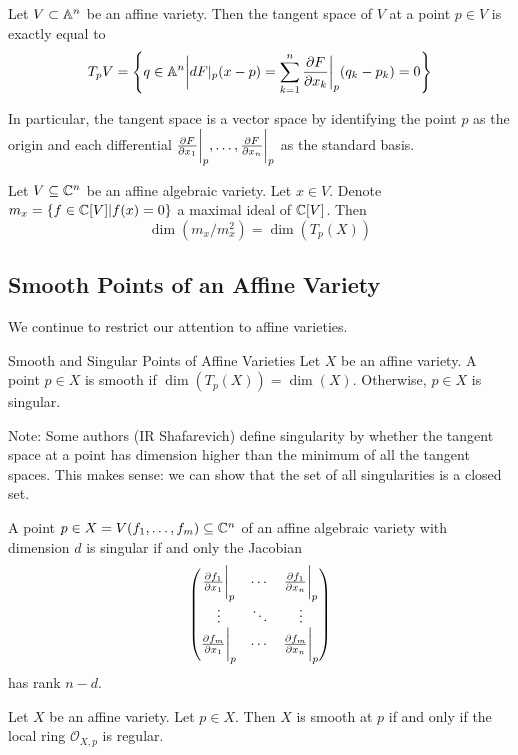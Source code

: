 \documentclass[a4paper]{article}
\begin{document}
\begin{prp}{}{} Let $V\subset\mathbb{A}^n$ be an affine variety. Then the tangent space of $V$ at a point $p\in V$ is exactly equal to $$T_pV=\left\{q\in\mathbb{A}^n\bigg{|}dF|_p(x-p)=\sum_{k=1}^n\frac{\partial F}{\partial x_k}\bigg{|}_p(q_k-p_k)=0\right\}$$
\end{prp}

In particular, the tangent space is a vector space by identifying the point $p$ as the origin and each differential $\frac{\partial F}{\partial x_1}\bigg{|}_p,\dots,\frac{\partial F}{\partial x_n}\bigg{|}_p$ as the standard basis. 

\begin{prp}{}{} Let $V\subseteq\mathbb{C}^n$ be an affine algebraic variety. Let $x\in V$. Denote $m_x=\{f\in\mathbb{C}[V]|f(x)=0\}$ a maximal ideal of $\mathbb{C}[V]$. Then $$\dim(m_x/m_x^2)=\dim(T_p(X))$$
\end{prp}

\subsection{Smooth Points of an Affine Variety}
We continue to restrict our attention to affine varieties. 

\begin{defn}{Smooth and Singular Points of Affine Varieties}{} Let $X$ be an affine variety. A point $p\in X$ is smooth if $\dim(T_p(X))=\dim(X)$. Otherwise, $p\in X$ is singular. 
\end{defn}

Note: Some authors (IR Shafarevich) define singularity by whether the tangent space at a point has dimension higher than the minimum of all the tangent spaces. This makes sense: we can show that the set of all singularities is a closed set. 

\begin{prp}{}{} A point $p\in X=V(f_1,\dots,f_m)\subseteq\mathbb{C}^n$ of an affine algebraic variety with dimension $d$ is singular if and only the Jacobian $$\begin{pmatrix}
\frac{\partial f_1}{\partial x_1}\bigg{|}_p & \cdots & \frac{\partial f_1}{\partial x_n}\bigg{|}_p\\
\vdots & \ddots & \vdots\\
\frac{\partial f_m}{\partial x_1}\bigg{|}_p & \cdots & \frac{\partial f_m}{\partial x_n}\bigg{|}_p
\end{pmatrix}$$
has rank $n-d$. 
\end{prp}

\begin{prp}{}{} Let $X$ be an affine variety. Let $p\in X$. Then $X$ is smooth at $p$ if and only if the local ring $\mathcal{O}_{X,p}$ is regular. 
\end{prp}
\end{document}
